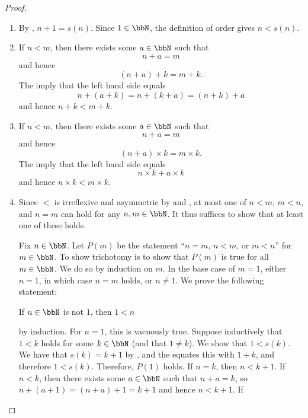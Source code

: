 \begin{proof}
    \begin{enumerate}
        \item By , $n + 1 = s(n)$. Since $1 \in \bbN$, the definition of order gives $n < s(n)$.

        \item If $n < m$, then there exists some $a \in \bbN$ such that 
        $$n + a = m$$
        and hence 
        $$(n+a)+k = m+k.$$
        The  imply that the left hand side equals
        $$n+(a+k) = n+(k+a) = (n+k)+a$$
        and hence $n+k < m+k$.

        \item 
        If $n < m$, then there exists some $a \in \bbN$ such that 
        $$n + a = m$$
        and hence 
        $$(n+a) \times k = m \times k.$$
        The  imply that the left hand side equals
        $$n \times k + a \times k$$
        and hence $n \times k < m \times k$.

        \item Since $<$ is irreflexive and asymmetric by  and , at most one of $n < m$, $m < n$, and $n = m$ can hold for any $n,m \in \bbN$. It thus suffices to show that at least one of these holds.

        Fix $n \in \bbN$. Let $P(m)$ be the statement ``$n = m$, $n < m$, or $m < n$'' for $m \in \bbN$. To show trichotomy is to show that $P(m)$ is true for all $m \in \bbN$. We do so by induction on $m$. In the base case of $m = 1$, either $n = 1$, in which case $n = m$ holds, or $n \neq 1$. We prove the following statement: 
        \begin{center}
            If $n \in \bbN$ is not $1$, then $1 < n$
        \end{center}
        by induction. For $n = 1$, this is vacuously true. Suppose inductively that $1 < k$ holds for some $k \in \bbN$ (and that $1 \neq k$). We show that $1 < s(k)$. We have that $s(k) = k+1$ by , and the  equates this with $1+k$, and therefore $1 < s(k)$. Therefore, $P(1)$ holds. If $n = k$, then $n < k+1$. If $n < k$, then there exists some $a \in \bbN$ such that $n + a = k$, so $n +(a+1) = (n+a)+1 = k+1$ and hence $n < k+1$. If 


\end{enumerate}
\end{proof}
